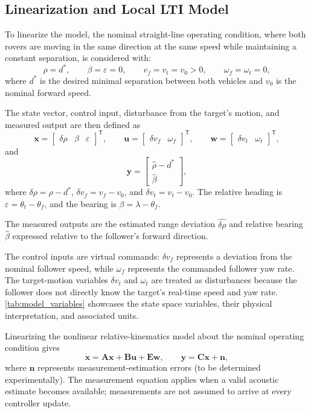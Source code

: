 \subsection{Linearization and Local LTI Model}
\label{sec:linearization}

To linearize the model, the nominal straight-line operating condition, where both rovers are moving in the same direction at the same speed while maintaining a constant separation, is considered with:
\[
\rho=d^\ast,\qquad
\beta=\varepsilon=0,\qquad
v_f=v_t=v_0>0,\qquad
\omega_f=\omega_t=0,
\]
where $d^\ast$ is the desired minimal separation between both vehicles and $v_0$ is the nominal forward speed.

The state vector, control input, disturbance from the target's motion, and measured output are then defined as
\[
\mathbf{x}=
\begin{bmatrix}
\delta\rho & \beta & \varepsilon
\end{bmatrix}^{\mathsf T},
\qquad
\mathbf{u}=
\begin{bmatrix}
\delta v_f & \omega_f
\end{bmatrix}^{\mathsf T},
\qquad
\mathbf{w}=
\begin{bmatrix}
\delta v_t & \omega_t
\end{bmatrix}^{\mathsf T},
\]
and
\[
\mathbf{y}=
\begin{bmatrix}
\hat{\rho}-d^\ast\\
\hat{\beta}
\end{bmatrix},
\]
where $\delta\rho=\rho-d^\ast$, $\delta v_f=v_f-v_0$, and $\delta v_t=v_t-v_0$. The relative heading is $\varepsilon=\theta_t-\theta_f$, and the bearing is $\beta=\lambda-\theta_f$. 

The measured outputs are the estimated range deviation $\hat{\delta\rho}$ and relative bearing $\hat{\beta}$ expressed relative to the follower's forward direction.

The control inputs are virtual commands: $\delta v_f$ represents a deviation from the nominal follower speed, while $\omega_f$ represents the commanded follower yaw rate. The target-motion variables $\delta v_t$ and $\omega_t$ are treated as disturbances because the follower does not directly know the target's real-time speed and yaw rate. \autoref{tab:model_variables} showcases the state space variables, their physical interpretation, and associated units. 

Linearizing the nonlinear relative-kinematics model about the nominal operating condition gives
\begin{equation}
\dot{\mathbf{x}}
=\mathbf{A}\mathbf{x}
+\mathbf{B}\mathbf{u}
+\mathbf{E}\mathbf{w},
\qquad
\mathbf{y}
=\mathbf{C}\mathbf{x}+\mathbf{n},
\label{eq:lin}
\end{equation}
where $\mathbf{n}$ represents measurement-estimation errors (to be determined experimentally). The measurement equation applies when a valid acoustic estimate becomes available; measurements are not assumed to arrive at every controller update.

